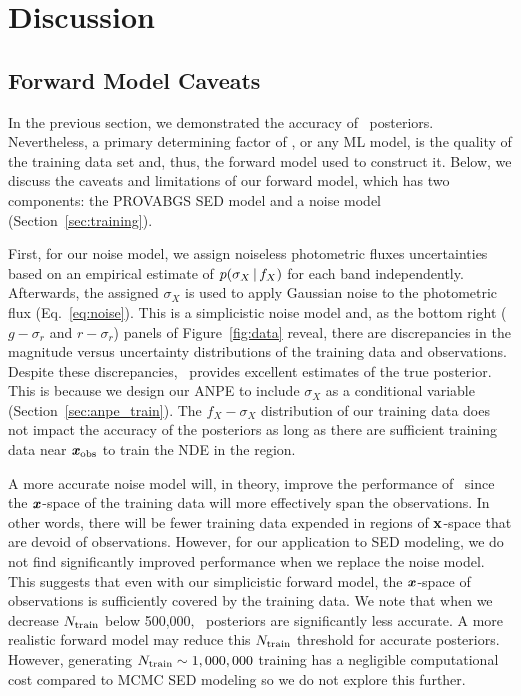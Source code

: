\section{Discussion} \label{sec:discuss}
\subsection{Forward Model Caveats} 
In the previous section, we demonstrated the accuracy of \sedflow~posteriors. 
Nevertheless, a primary determining factor of \sedflow, or any ML model, is
the quality of the training data set and, thus, the forward model used to
construct it. 
Below, we discuss the caveats and limitations of our forward model, which has
two components: the PROVABGS SED model and a noise model
(Section~\ref{sec:training}).

First, for our noise model, we assign noiseless photometric fluxes
uncertainties based on an empirical estimate of $p(\sigma_X\,|\, f_X)$ for
each band independently. 
Afterwards, the assigned $\sigma_X$ is used to apply Gaussian noise to the
photometric flux (Eq.~\ref{eq:noise}). 
This is a simplicistic noise model and, as the bottom right ($g - \sigma_r$ and
$r - \sigma_r$) panels of Figure~\ref{fig:data} reveal, there are discrepancies
in the magnitude versus uncertainty distributions of the training data and
observations. 
Despite these discrepancies, \sedflow~provides excellent estimates of the true
posterior.  
This is because we design our ANPE to include $\sigma_X$ as a conditional
variable (Section~\ref{sec:anpe_train}).
The $f_X-\sigma_X$ distribution of our training data does not impact the
accuracy of the posteriors as long as there are sufficient training data near
$\textbf{\textit{x}}_{\rm obs}$ to train the NDE in the region.

A more accurate noise model will, in theory, improve the performance of
\sedflow~since the $\textbf{\textit{x}}$-space of the training data will more effectively
span the observations. 
In other words, there will be fewer training data expended in regions of 
${\bf x}$-space that are devoid of observations.  
However, for our application to SED modeling, we do not find significantly  
improved performance when we replace the noise model.
This suggests that even with our simplicistic forward model, the
$\textbf{\textit{x}}$-space of observations is sufficiently covered by the training data. 
We note that when we decrease $N_{\rm train}$ below 500,000,
\sedflow~posteriors are significantly less accurate. 
A more realistic forward model may reduce this $N_{\rm train}$ threshold for
accurate posteriors. 
However, generating $N_{\rm train} \sim 1,000,000$ training has a negligible
computational cost compared to MCMC SED modeling so we do not explore this
further. 

